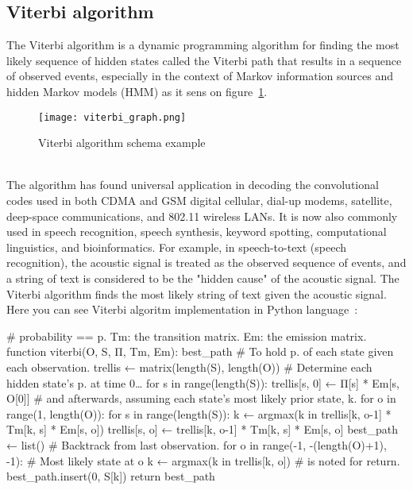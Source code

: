 \subsection{Viterbi algorithm} \label{subsec:viterbi}
The Viterbi algorithm is a dynamic programming algorithm for finding the most likely sequence of hidden
states called the Viterbi path that results in a sequence of observed events, especially in the
context of Markov information sources and hidden Markov models (HMM) as it sens on figure~\ref{viterbi-schema}.
\begin{figure}[h!]
	\begin{center}
		\texttt{[image: viterbi\_graph.png]}
	\end{center}
	\caption{Viterbi algorithm schema example~\cite{viterbi}}
	\label{viterbi-schema}
\end{figure}\\
The algorithm has found universal application in decoding the convolutional codes used in
both CDMA and GSM digital cellular, dial-up modems, satellite, deep-space communications, and 802.11 wireless LANs.
It is now also commonly used in speech recognition, speech synthesis, keyword spotting, computational
linguistics, and bioinformatics.
For example, in speech-to-text (speech recognition), the acoustic signal is treated as the observed sequence of events,
and a string of text is considered to be the "hidden cause" of the acoustic signal.
The Viterbi algorithm finds the most likely string of text given the acoustic signal.\\
Here you can see Viterbi algoritm implementation in Python language~\cite{DBLP:journals/corr/abs-cs-0504020}: \\
\begin{python}
# probability == p. Tm: the transition matrix. Em: the emission matrix.
function viterbi(O, S, Π, Tm, Em): best_path
  # To hold p. of each state given each observation.
  trellis ← matrix(length(S), length(O))
  # Determine each hidden state's p. at time 0…
  for s in range(length(S)):
    trellis[s, 0] ← Π[s] * Em[s, O[0]]
  # and afterwards, assuming each state's most likely prior state, k.
  for o in range(1, length(O)):
    for s in range(length(S)):
      k ← argmax(k in trellis[k, o-1] * Tm[k, s] * Em[s, o])
      trellis[s, o] ← trellis[k, o-1] * Tm[k, s] * Em[s, o]
  best_path ← list()
  # Backtrack from last observation.
  for o in range(-1, -(length(O)+1), -1):
    # Most likely state at o
    k ← argmax(k in trellis[k, o])
    # is noted for return.
    best_path.insert(0, S[k])
  return best_path
\end{python}\\

